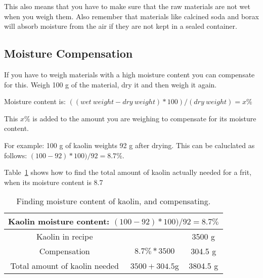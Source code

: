 This also means that you have to make sure that the raw materials are not wet 
when you weigh them. Also remember that materials like calcined soda and borax 
will absorb moisture from the air if they are not kept in a sealed container.
\subsection{Moisture Compensation}
If you have to weigh materials with a high moisture content you can compensate 
for this. Weigh 100 g of the material, dry it and then weigh it again. 

Moisture content is: $((wet~weight-dry~weight)*100)/(dry~weight)=x\%$

This $x\%$ is added to the amount you are weighing to compensate for its 
moisture content. 

For example: 100 g of kaolin weights 92 g after drying. This can be caluclated 
as follows: $(100-92)*100)/92=8.7\%$.

Table~\ref{tab:moisturecompensation} shows how to find the total amount of 
kaolin actually needed for a frit, when its moisture content is 8.7%
\begin{center}
  \renewcommand{\arraystretch}{1.5}
  \begin{table}[htbp!]\centering
    \begin{tabular}{|c|c|c|}\hline
      \multicolumn{3}{|c|}{\textbf{Kaolin moisture content: 
      $(100-92)*100)/92=8.7\%$}}\\\hline\hline
      Kaolin in recipe&&3500 g\\\hline
      Compensation&$8.7\%*3500$&304.5 g\\\hline
      Total amount of kaolin needed&$3500 + 304.5$g&3804.5 g\\\hline
    \end{tabular}
    \caption{Finding moisture content of kaolin, and compensating.}
    \label{tab:moisturecompensation}
  \end{table}
\end{center}
